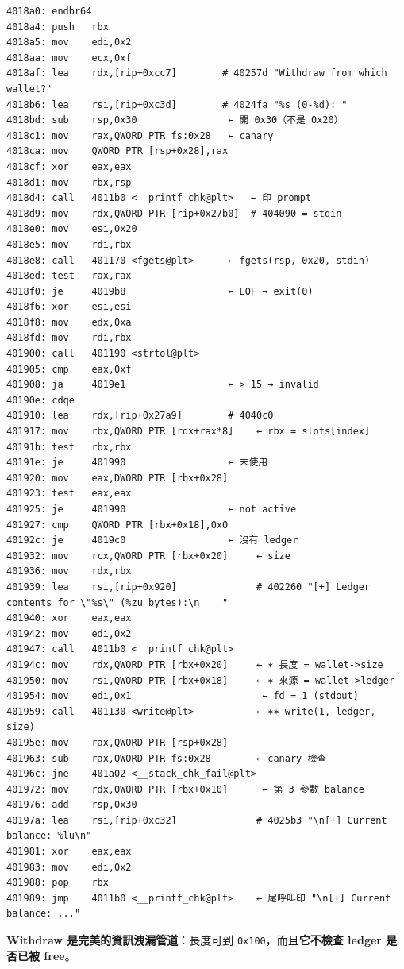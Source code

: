 \documentclass[10pt,a4paper]{article}
\begin{document}
\begin{Verbatim}[breaklines=true,breakanywhere=true,breakautoindent=false,fontsize=\fontsize{7.0}{9.5}\selectfont]
4018a0: endbr64
4018a4: push   rbx
4018a5: mov    edi,0x2
4018aa: mov    ecx,0xf
4018af: lea    rdx,[rip+0xcc7]        # 40257d "Withdraw from which wallet?"
4018b6: lea    rsi,[rip+0xc3d]        # 4024fa "%s (0-%d): "
4018bd: sub    rsp,0x30                ← 開 0x30（不是 0x20）
4018c1: mov    rax,QWORD PTR fs:0x28   ← canary
4018ca: mov    QWORD PTR [rsp+0x28],rax
4018cf: xor    eax,eax
4018d1: mov    rbx,rsp
4018d4: call   4011b0 <__printf_chk@plt>   ← 印 prompt
4018d9: mov    rdx,QWORD PTR [rip+0x27b0]  # 404090 = stdin
4018e0: mov    esi,0x20
4018e5: mov    rdi,rbx
4018e8: call   401170 <fgets@plt>      ← fgets(rsp, 0x20, stdin)
4018ed: test   rax,rax
4018f0: je     4019b8                  ← EOF → exit(0)
4018f6: xor    esi,esi
4018f8: mov    edx,0xa
4018fd: mov    rdi,rbx
401900: call   401190 <strtol@plt>
401905: cmp    eax,0xf
401908: ja     4019e1                  ← > 15 → invalid
40190e: cdqe
401910: lea    rdx,[rip+0x27a9]        # 4040c0
401917: mov    rbx,QWORD PTR [rdx+rax*8]    ← rbx = slots[index]
40191b: test   rbx,rbx
40191e: je     401990                  ← 未使用
401920: mov    eax,DWORD PTR [rbx+0x28]
401923: test   eax,eax
401925: je     401990                  ← not active
401927: cmp    QWORD PTR [rbx+0x18],0x0
40192c: je     4019c0                  ← 沒有 ledger
401932: mov    rcx,QWORD PTR [rbx+0x20]     ← size
401936: mov    rdx,rbx
401939: lea    rsi,[rip+0x920]              # 402260 "[+] Ledger contents for \"%s\" (%zu bytes):\n    "
401940: xor    eax,eax
401942: mov    edi,0x2
401947: call   4011b0 <__printf_chk@plt>
40194c: mov    rdx,QWORD PTR [rbx+0x20]     ← ✶ 長度 = wallet->size
401950: mov    rsi,QWORD PTR [rbx+0x18]     ← ✶ 來源 = wallet->ledger
401954: mov    edi,0x1                       ← fd = 1 (stdout)
401959: call   401130 <write@plt>           ← ✶✶ write(1, ledger, size)
40195e: mov    rax,QWORD PTR [rsp+0x28]
401963: sub    rax,QWORD PTR fs:0x28        ← canary 檢查
40196c: jne    401a02 <__stack_chk_fail@plt>
401972: mov    rdx,QWORD PTR [rbx+0x10]      ← 第 3 參數 balance
401976: add    rsp,0x30
40197a: lea    rsi,[rip+0xc32]              # 4025b3 "\n[+] Current balance: %lu\n"
401981: xor    eax,eax
401983: mov    edi,0x2
401988: pop    rbx
401989: jmp    4011b0 <__printf_chk@plt>    ← 尾呼叫印 "\n[+] Current balance: ..."
\end{Verbatim}

\textbf{Withdraw 是完美的資訊洩漏管道}：長度可到
\texttt{0x100}，而且\textbf{它不檢查 ledger 是否已被 free}。
\end{document}
